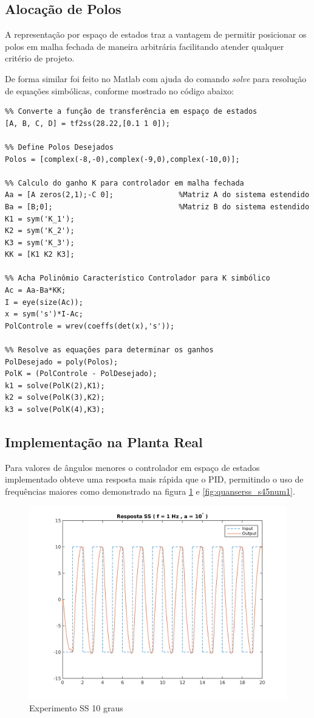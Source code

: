 \documentclass[a4paper,11pt]{article}
\begin{document}
\subsection{Alocação de Polos}

A representação por espaço de estados traz a vantagem de permitir posicionar os polos em malha fechada de maneira arbitrária facilitando atender qualquer critério de projeto.

De forma similar foi feito no Matlab com ajuda do comando \textit{solve} para resolução de equações simbólicas, conforme mostrado no código abaixo:

\begin{verbatim}
%% Converte a função de transferência em espaço de estados 
[A, B, C, D] = tf2ss(28.22,[0.1 1 0]);

%% Define Polos Desejados
Polos = [complex(-8,-0),complex(-9,0),complex(-10,0)];

%% Calculo do ganho K para controlador em malha fechada 
Aa = [A zeros(2,1);-C 0];               %Matriz A do sistema estendido
Ba = [B;0];                             %Matriz B do sistema estendido
K1 = sym('K_1');
K2 = sym('K_2');
K3 = sym('K_3');
KK = [K1 K2 K3];

%% Acha Polinômio Característico Controlador para K simbólico
Ac = Aa-Ba*KK;
I = eye(size(Ac));
x = sym('s')*I-Ac;
PolControle = wrev(coeffs(det(x),'s'));

%% Resolve as equações para determinar os ganhos
PolDesejado = poly(Polos);
PolK = (PolControle - PolDesejado);
k1 = solve(PolK(2),K1);
k2 = solve(PolK(3),K2);
k3 = solve(PolK(4),K3);
\end{verbatim}

\subsection{Implementação na Planta Real}

Para valores de ângulos menores o controlador em espaço de estados implementado obteve uma resposta mais rápida que o PID, permitindo o uso de frequências maiores como demonstrado na figura \ref{fig:quanserss_s10num1} e \ref{fig:quanserss_s45num1}.

\begin{figure}[H]
    \centering
    \includegraphics[width=0.8\linewidth]{tex/img/quanserss_s10num1.png}
    \caption{Experimento SS 10 graus}
    \label{fig:quanserss_s10num1}
\end{figure}
\end{document}
